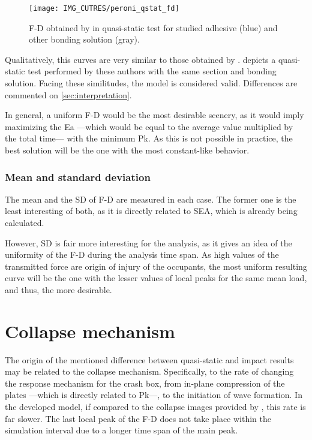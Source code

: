 \documentclass[cmfonts]{witpress}
\begin{document}
\begin{figure}
	\centering
	\texttt{[image: IMG\_CUTRES/peroni\_qstat\_fd]}
	\caption[F-D obtained by \cite{Peroni2009} in quasi-static test for studied adhesive and other bonding solution.]{F-D obtained by \cite{Peroni2009} in quasi-static test for studied adhesive (blue) and other bonding solution (gray).}
	\label{fig:peroni_qstat_fd}
\end{figure}

Qualitatively, this curves are very similar to those obtained by \cite{Peroni2009}.  depicts a quasi-static test performed by these authors with the same section and bonding solution. Facing these similitudes, the model is considered valid. Differences are commented on \cref{sec:interpretation}.

In general, a uniform F-D would be the most desirable scenery, as it would imply maximizing the Ea ---which would be equal to the average value multiplied by the total time--- with the minimum Pk. As this is not possible in practice, the best solution will be the one with the most constant-like behavior.

\subsubsection{Mean and standard deviation}

The mean and the SD of F-D are measured in each case. The former one is the least interesting of both, as it is directly related to SEA, which is already being calculated.

However, SD is fair more interesting for the analysis, as it gives an idea of the uniformity of the F-D during the analysis time span. As high values of the transmitted force are origin of injury of the occupants, the most uniform resulting curve will be the one with the lesser values of local peaks for the same mean load, and thus, the more desirable.

\section{Collapse mechanism}

The origin of the mentioned difference between quasi-static and impact results may be related to the collapse mechanism. Specifically, to the rate of changing the response mechanism for the crash box, from in-plane compression of the plates ---which is directly related to Pk---, to the initiation of wave formation. In the developed model, if compared to the collapse images provided by \cite{Scattina2011}, this rate is far slower. The last local peak of the F-D does not take place within the simulation interval due to a longer time span of the main peak.
\end{document}
